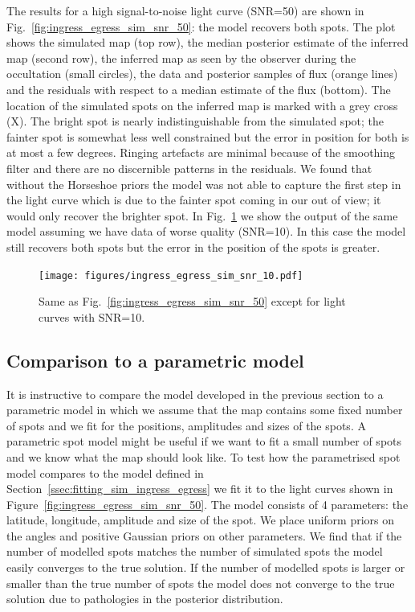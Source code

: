 \documentclass[12pt,dvipsnames]{report}
\begin{document}
The results for a high signal-to-noise light curve (SNR=50) are shown in Fig.~\ref{fig:ingress_egress_sim_snr_50}: the model recovers both spots.
The plot shows the simulated map (top row), the median posterior estimate of the inferred map (second row), the inferred map as seen by the observer during the occultation (small circles), the data and posterior samples of flux (orange lines) and the residuals with respect to a median estimate of the flux (bottom). 
The location of the simulated spots on the inferred map is marked with a grey cross (X).
The bright spot is nearly indistinguishable from the simulated spot; the fainter spot is somewhat less well constrained but the error in position for both is at most a few degrees.
Ringing artefacts are minimal because of the smoothing filter and there are no discernible patterns in the residuals.
We found that without the Horseshoe priors the model was not able to capture the first step in the light curve which is due to the fainter spot coming in our out of view; it would only recover the brighter spot.
In Fig.~\ref{fig:ingress_egress_sim_snr_10} we show the output of the same model assuming we have data of worse quality (SNR=10). 
In this case the model still recovers both spots but the error in the position of the spots is greater.

\begin{figure}[t!]
    \begin{centering}
        \texttt{[image: figures/ingress\_egress\_sim\_snr\_10.pdf]}
    \caption{
        Same as Fig.~\ref{fig:ingress_egress_sim_snr_50} except for light curves with SNR=10.
    }
       \label{fig:ingress_egress_sim_snr_10}
    \end{centering}
\end{figure}

\subsection{Comparison to a parametric model}
It is instructive to compare the model developed in the previous section to a parametric model in which we assume that the map contains some fixed number of spots and we fit for the positions, amplitudes and sizes of the spots.
A parametric spot model might be useful if we want to fit a small number of spots and we know what the map should look like.
To test how the parametrised spot model compares to the model defined in Section~\ref{ssec:fitting_sim_ingress_egress} we fit it to the light curves shown in Figure~\ref{fig:ingress_egress_sim_snr_50}. 
The model consists of 4 parameters: the latitude, longitude, amplitude and size of the spot.
We place uniform priors on the angles and positive Gaussian priors on other parameters. 
We find that if the number of modelled spots matches the number of simulated spots the model easily converges to the true solution. 
If the number of modelled spots is larger or smaller than the true number of spots the model does not converge to the true solution due to pathologies in the posterior distribution.
\end{document}
